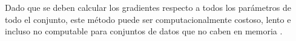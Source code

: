 Dado que se deben calcular los gradientes respecto a todos los parámetros de todo el conjunto, este método puede ser computacionalmente costoso, lento e incluso no computable para conjuntos de datos que no caben en memoria \cite{ruder2016overview, zhang2019gradient}. 


